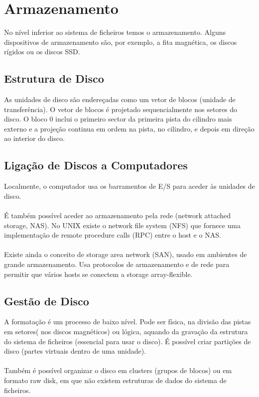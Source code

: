 \documentclass[10pt,a4paper]{report}
\begin{document}
\section{Armazenamento}
No nível inferior ao sistema de ficheiros temos o armazenamento. Alguns dispositivos de armazenamento são, por exemplo, a fita magnética, os discos rígidos ou os discos SSD.
\subsection{Estrutura de Disco}
As unidades de disco são endereçadas como um vetor de blocos (unidade de transferência). O vetor de blocos é projetado sequencialmente nos setores do disco. O bloco 0 inclui o primeiro sector da primeira pista do cilindro mais externo e a projeção continua em ordem na pista, no cilindro, e depois em direção ao interior do disco.
\subsection{Ligação de Discos a Computadores}
Localmente, o computador usa os barramentos de E/S para aceder às unidades de disco.\\
\\
É também possível aceder ao armazenamento pela rede (network attached storage, NAS). No UNIX existe o network file system (NFS) que fornece uma implementação de remote procedure calls (RPC) entre o host e o NAS.\\
\\
Existe ainda o conceito de storage area network (SAN), usado em ambientes de grande armazenamento. Usa protocolos de armazenamento e de rede para permitir que vários hosts se conectem a storage array-flexible.
\subsection{Gestão de Disco}
A formatação é um processo de baixo nível. Pode ser física, na divisão das pistas em setores( nos discos magnéticos) ou lógica, aquando da gravação da estrutura do sistema de ficheiros (essencial para usar o disco). É possível criar partições de disco (partes virtuais dentro de uma unidade).\\
\\
Também é possível organizar o disco em clusters (grupos de blocos) ou em formato raw disk, em que não existem estruturas de dados do sistema de ficheiros.
\end{document}
